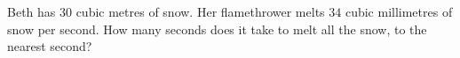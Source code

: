 Beth has $30$ cubic metres of snow. Her flamethrower melts $34$ cubic millimetres of snow per second. How many seconds does it take to melt all the snow, to the nearest second?
